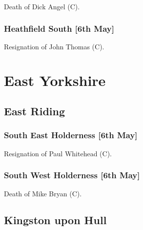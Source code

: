 \documentclass[a4paper,openany]{book}
\begin{document}
\begin{resultsiii}

Death of Dick Angel (C).

\subsubsection*{Heathfield South \hspace*{\fill}\nolinebreak[1]%
	\enspace\hspace*{\fill}
	[6th May]}


Resignation of John Thomas (C).

\section{East Yorkshire}

\subsection*{East Riding}

\subsubsection*{South East Holderness \hspace*{\fill}\nolinebreak[1]%
	\enspace\hspace*{\fill}
	[6th May]}


Resignation of Paul Whitehead (C).

\subsubsection*{South West Holderness \hspace*{\fill}\nolinebreak[1]%
	\enspace\hspace*{\fill}
	[6th May]}


Death of Mike Bryan (C).

\subsection*{Kingston upon Hull}


\end{resultsiii}
\end{document}
